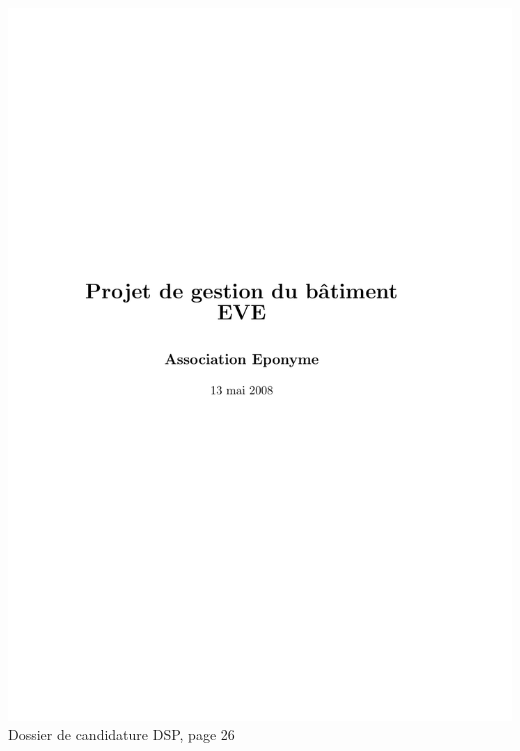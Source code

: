 \includegraphics[scale=0.85,trim=20mm 20mm 20mm 20mm,clip,page=26]{annexes/candidature_dsp.pdf} \\
Dossier de candidature DSP, page 26
\newpage
